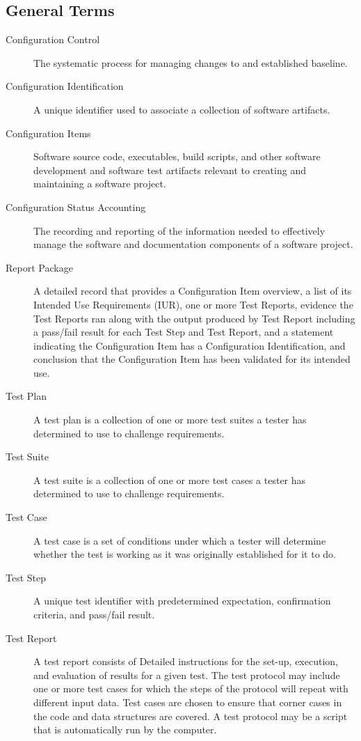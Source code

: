 \subsection{General Terms}
\begin{description}

\item[Configuration Control] \quad The systematic process for managing changes
  to and established baseline.

\item[Configuration Identification] \quad A unique identifier used to associate
  a collection of software artifacts.

\item[Configuration Items] \quad Software source code, executables, build
  scripts, and other software development and software test artifacts relevant
  to creating and maintaining a software project.

\item[Configuration Status Accounting] \quad The recording and reporting of the
  information needed to effectively manage the software and documentation
  components of a software project.

\item[Report Package] \quad A detailed record that provides a Configuration
  Item overview, a list of its Intended Use Requirements (IUR), one or more Test
  Reports, evidence the Test Reports ran along with the output produced by
  Test Report including a pass/fail result for each Test Step and Test
  Report, and a statement indicating the Configuration Item has
  a Configuration Identification, and conclusion that the Configuration Item has
  been validated for its intended use.

\item[Test Plan] \quad A test plan is a collection of one or more test suites
  a tester has determined to use to challenge requirements.

\item[Test Suite] \quad A test suite is a collection of one or more test cases 
  a tester has determined to use to challenge requirements.

\item[Test Case] \quad A test case is a set of conditions under which a tester
  will determine whether the test is working as it was originally established
  for it to do.

\item[Test Step] \quad A unique test identifier with predetermined expectation,
  confirmation criteria, and pass/fail result.

\item[Test Report] \quad A test report consists of Detailed instructions for
  the set-up, execution, and evaluation of results for a given test.  The test
  protocol may include one or more test cases for which the steps of the
  protocol will repeat with different input data. Test cases are chosen to
  ensure that corner cases in the code and data structures are covered. A test
  protocol may be a script that is automatically run by the computer.
\end{description}
